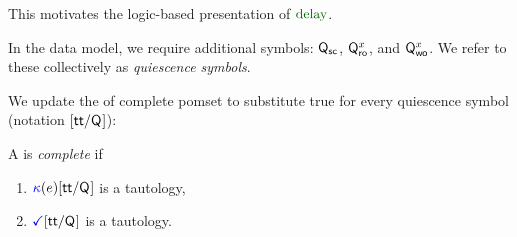 This motivates the logic-based presentation of $\rdelay$.

In the data model, we require additional symbols: $\mathsf{Q}_{{\mathsf{sc}}}$, $\mathsf{Q}_{\mathsf{ro}}^{x}$,
and $\mathsf{Q}_{\mathsf{wo}}^{x}$.  We refer to these collectively as \emph{quiescence
  symbols}.

We update the  of complete pomset to substitute true for every
quiescence symbol (notation $[\mathsf{tt}/\mathsf{Q}_{}]$):
\begin{definition}
  A \PwT{} is \emph{complete} if
  \begin{multicols}{2}
    \begin{enumerate}[,label=(\textsc{c}\arabic*),ref=\textsc{c}\arabic*]
      \setcounter{enumi}{\value{Bkappa}}
    \item \label{top-kappa-q}
      ${\color{blue}\kappa}(e)[\mathsf{tt}/\mathsf{Q}_{}]$ is a tautology,
      \setcounter{enumi}{\value{Bterm}}
    \item \label{top-term-q} $\aTerm{}[\TRUE/\Q{}]$ is a tautology.
    \end{enumerate}
  \end{multicols}
\end{definition}

